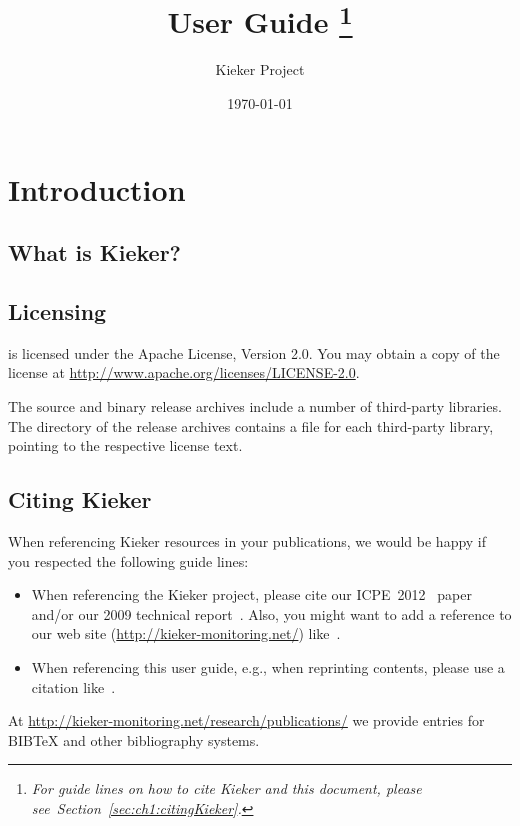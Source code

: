 \documentclass[paper=a4,twoside=false,fontsize=11pt,numbers=noenddot,version=first,bibliography=totoc,headsepline]{scrbook}
\title{%
\Huge\Kieker{} \version{} User Guide%
\footnote{\sffamily \textit{For guide lines on how to cite Kieker and this document, please see~Section~\ref{sec:ch1:citingKieker}.}}
}
\author{\sffamily Kieker Project%
}
\date{\sffamily\today}
\begin{document}
  \maketitle
  \setcounter{tocdepth}{1} %
  {\sffamily\tableofcontents}

	\chapter{Introduction}\label{chp:Introduction}
		\section{What is Kieker?}
		\section{Licensing}
			\Kieker{} is licensed under the Apache License, Version 2.0. You may obtain a copy of the license at \url{http://www.apache.org/licenses/LICENSE-2.0}.
			
			The \Kieker{} source and binary release archives include a number of third-party libraries. The  directory of the release archives contains a  file for each third-party library, pointing to the respective license text.
		
		\section{Citing Kieker}
			When referencing Kieker resources in your publications, we would be happy if you respected the following guide lines:

			\begin{itemize}
				\item 
				When referencing the Kieker project, please cite our ICPE~2012~\cite{KiekerICPE2012} paper and/or our 2009 technical report~\cite{vanHoornRohrHasselbringWallerEhlersFreyKieselhorst2009TRContinuousMonitoringOfSoftwareServicesDesignAndApplicationOfTheKiekerFramework}. Also, you might want to add a reference to our web site (\url{http://kieker-monitoring.net/}) like~\cite{KiekerWebSite}. 
				\item 
				When referencing this user guide, e.g., when reprinting contents, please use a citation like~\cite{Kieker1.7UserGuide}.
			\end{itemize}

			\noindent At \url{http://kieker-monitoring.net/research/publications/} we provide entries for $\mathrm{B\scriptstyle IB}\!$\TeX{} and other bibliography systems.
\end{document}
